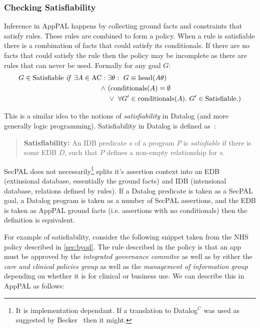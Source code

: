\documentclass[a4paper]{scrartcl}
\begin{document}
\subsubsection{Checking Satisfiability}

Inference in AppPAL happens by collecting ground facts and constraints that
satisfy rules. These rules are combined to form a policy. When a rule is
satisfiable there is a combination of facts that could satisfy
its conditionals. If there are no facts that could satisfy the rule then the policy may be incomplete as there are rules that can never be
used.  Formally for any goal $G$:
\begin{align*}
  G \in \text{Satisfiable}~\text{\textit{if}}~\exists A \in \text{AC}:~&\exists \theta:~G\equiv\text{head}(A\theta) \\
                                                              \wedge~ & (\text{conditionals}(A) = \emptyset \\
                                                                      & \vee~\forall G^\prime \in \text{conditionals}(A).~G^\prime \in \text{Satisfiable}.)
\end{align*}

This is a similar idea to the notions of \emph{satisfiability} in Datalog (and
more generally logic programming).  Satisfiability in Datalog is defined
as~\cite{alon_levy_equivalence_1993}:

\begin{quote}
  \textbf{Satisfiability:} An IDB predicate $s$ of a program $P$ is
  \emph{satisfiable} if there is some EDB $D$, such that $P$ defines a
  non-empty relationship for $s$.
\end{quote}

SecPAL does not necessarily\footnote{It is implementation dependant. If a
  translation to Datalog$^C$ was used as suggested by
  Becker~\cite{becker_secpal:_2010} then it might.} splits it's assertion
  context into an EDB (extinsional database, essentially the ground facts) and
  IDB (intensional database, relations defined by rules).  If a Datalog
  predicate is taken as a SecPAL goal, a Datalog program is taken as a number
  of SecPAL assertions, and the EDB is taken as AppPAL ground facts (i.e.
  assertions with no conditionals) then the definition is equivalent.

For example of satisfiability, consider the following snippet taken from the
NHS policy described in \autoref{sec:byod}.  The rule described in the policy
is that an app must be approved by the \emph{integrated governance commitee} as
well as by either the \emph{care and clinical policies group} as well as the
\emph{management of information group} depending on whether it is for clinical
or business use. We can describe this in AppPAL as follows:
\end{document}
